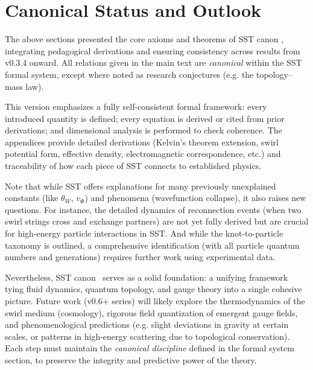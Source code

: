 \documentclass[reprint,aps,onecolumn,nofootinbib]{revtex4-2}
\begin{document}

	\section{Canonical Status and Outlook}
	The above sections presented the core axioms and theorems of SST canon \canonversion, integrating pedagogical derivations and ensuring consistency across results from v0.3.4 onward. All relations given in the main text are \emph{canonical} within the SST formal system, except where noted as research conjectures (e.g. the topology–mass law).

	This version emphasizes a fully self-consistent formal framework: every introduced quantity is defined; every equation is derived or cited from prior derivations; and dimensional analysis is performed to check coherence. The appendices provide detailed derivations (Kelvin’s theorem extension, swirl potential form, effective density, electromagnetic correspondence, etc.) and traceability of how each piece of SST connects to established physics.

	Note that while SST offers explanations for many previously unexplained constants (like $\theta_W$, $v_{\Phi}$) and phenomena (wavefunction collapse), it also raises new questions. For instance, the detailed dynamics of reconnection events (when two swirl strings cross and exchange partners) are not yet fully derived but are crucial for high-energy particle interactions in SST. And while the knot-to-particle taxonomy is outlined, a comprehensive identification (with all particle quantum numbers and generations) requires further work using experimental data.

	Nevertheless, SST canon \canonversion \ serves as a solid foundation: a unifying framework tying fluid dynamics, quantum topology, and gauge theory into a single cohesive picture. Future work (v0.6+ series) will likely explore the thermodynamics of the swirl medium (cosmology), rigorous field quantization of emergent gauge fields, and phenomenological predictions (e.g. slight deviations in gravity at certain scales, or patterns in high-energy scattering due to topological conservation). Each step must maintain the \emph{canonical discipline} defined in the formal system section, to preserve the integrity and predictive power of the theory.


	\appendix
\end{document}
